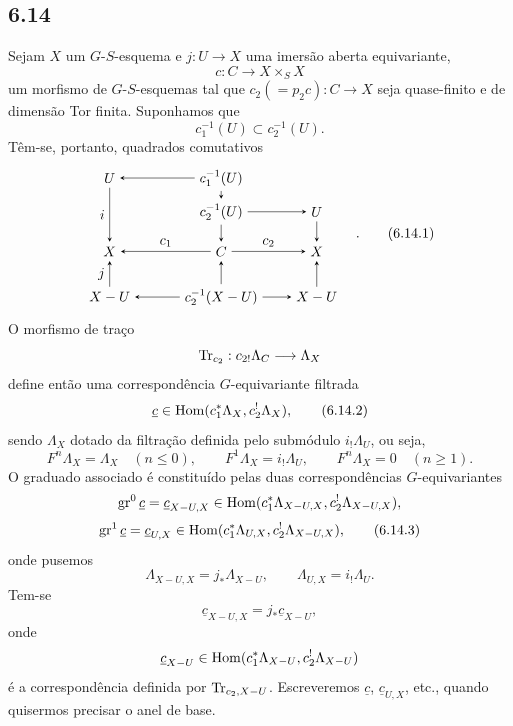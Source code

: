 \subsection*{6.14}
Sejam $X$ um $G$-$S$-esquema e $j:U\to X$ uma imersão aberta equivariante,
\[
c:C\to X\times_SX
\]
um morfismo de $G$-$S$-esquemas tal que $c_2(=p_2c):C\to X$ seja quase-finito e de dimensão Tor finita. Suponhamos que
\[
c_1^{-1}(U)\subset c_2^{-1}(U).
\]
Têm-se, portanto, quadrados comutativos
\begin{equation}
\begin{tikzpicture}[baseline=(current bounding box.center),>=stealth]
\node (U1) at (0,3.0) {$U$};
\node (C1U) at (2.8,3.0) {$c_1^{-1}(U)$};
\node (C2U) at (2.8,2.15) {$c_2^{-1}(U)$};
\node (U2) at (5.2,2.15) {$U$};
\node (X1) at (0,1.15) {$X$};
\node (C) at (2.8,1.15) {$C$};
\node (X2) at (5.2,1.15) {$X$};
\node (XU1) at (0,0) {$X-U$};
\node (C2XU) at (2.8,0) {$c_2^{-1}(X-U)$};
\node (XU2) at (5.2,0) {$X-U$};
\draw[->] (C1U) -- (U1);
\draw[->] (C1U) -- (C2U);
\draw[->] (C2U) -- (U2);
\draw[->] (U1) -- node[left] {$i$} (X1);
\draw[->] (U2) -- (X2);
\draw[->] (C2U) -- (C);
\draw[->] (C2XU) -- (C);
\draw[->] (C) -- node[above] {$c_1$} (X1);
\draw[->] (C) -- node[above] {$c_2$} (X2);
\draw[->] (XU1) -- node[left] {$j$} (X1);
\draw[->] (XU2) -- (X2);
\draw[->] (C2XU) -- (XU1);
\draw[->] (C2XU) -- (XU2);
\end{tikzpicture}\quad.
\tag{6.14.1}
\end{equation}
O morfismo de traço
\[
\operatorname{Tr}_{c_2}:c_{2!}\Lambda_C\longrightarrow \Lambda_X
\]
define então uma correspondência $G$-equivariante filtrada
\begin{equation}
\underline c\in\operatorname{Hom}(c_1^*\Lambda_X,c_2^!\Lambda_X),
\tag{6.14.2}
\end{equation}
sendo $\Lambda_X$ dotado da filtração definida pelo submódulo $i_!\Lambda_U$, ou seja,
\[
F^n\Lambda_X=\Lambda_X\quad(n\le0),\qquad
F^1\Lambda_X=i_!\Lambda_U,\qquad
F^n\Lambda_X=0\quad(n\ge1).
\]
O graduado associado é constituído pelas duas correspondências $G$-equivariantes
\[
\operatorname{gr}^0\underline c=\underline c_{X-U,X}
\in\operatorname{Hom}(c_1^*\Lambda_{X-U,X},c_2^!\Lambda_{X-U,X}),
\]
\begin{equation}
\operatorname{gr}^1\underline c=\underline c_{U,X}
\in\operatorname{Hom}(c_1^*\Lambda_{U,X},c_2^!\Lambda_{X-U,X}),
\tag{6.14.3}
\end{equation}
onde pusemos
\[
\Lambda_{X-U,X}=j_*\Lambda_{X-U},\qquad
\Lambda_{U,X}=i_!\Lambda_U.
\]
Tem-se
\begin{equation}
\underline c_{X-U,X}=j_*\underline c_{X-U},
\tag{6.14.4}
\end{equation}
onde
\[
\underline c_{X-U}\in\operatorname{Hom}(c_1^*\Lambda_{X-U},c_2^!\Lambda_{X-U})
\]
é a correspondência definida por $\operatorname{Tr}_{c_2,X-U}$. Escreveremos $\underline c$, $\underline c_{U,X}$, etc., quando quisermos precisar o anel de base.

